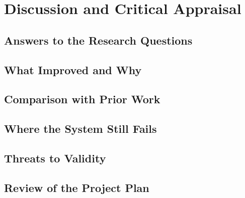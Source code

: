 \chapter{Discussion and Critical Appraisal}
\label{cha:discussion}

\section{Answers to the Research Questions}
\label{sec:answer-research-questions}

\section{What Improved and Why}
\label{sec:what-improved-why}

\section{Comparison with Prior Work}
\label{sec:comparison-prior-work}

\section{Where the System Still Fails}
\label{sec:where-system-still-fails}

\section{Threats to Validity}
\label{sec:threats-to-validity}

\section{Review of the Project Plan}
\label{sec:review-project-plan}